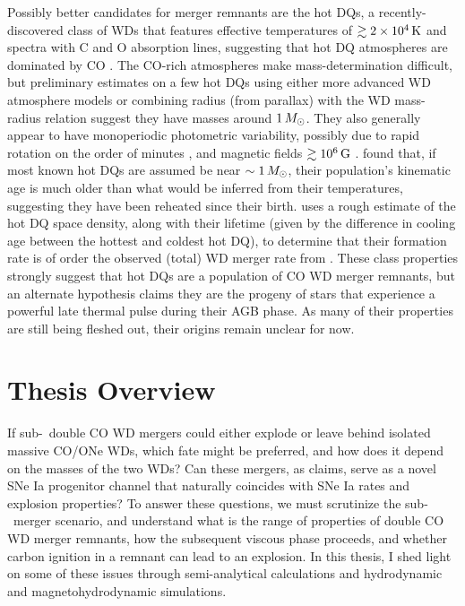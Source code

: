 Possibly better candidates for merger remnants are the hot DQs, a recently-discovered class of WDs that features effective temperatures of $\gtrsim2\times10^4\,\mathrm{K}$ and spectra with C and O absorption lines, suggesting that hot DQ atmospheres are dominated by CO \citep{dufo+07, dufo+08}.  The CO-rich atmospheres make mass-determination difficult, but preliminary estimates on a few hot DQs using either more advanced WD atmosphere models \citep{dufo+11} or combining radius (from parallax) with the WD mass-radius relation \citep{dunl15thesis} suggest they have masses around $1\,\Msun$.  They also generally appear to have monoperiodic photometric variability, possibly due to rapid rotation on the order of minutes \citep{lawr+13, will+16}, and magnetic fields $\gtrsim10^6\,\mathrm{G}$ \citep{dufo+13}.  \cite{dunlc15} found that, if most known hot DQs are assumed be near $\sim1\,\Msun$, their population's kinematic age is much older than what would be inferred from their temperatures, suggesting they have been reheated since their birth.  \cite{dunl15thesis} uses a rough estimate of the hot DQ space density, along with their lifetime (given by the difference in cooling age between the hottest and coldest hot DQ), to determine that their formation rate is of order the observed (total) WD merger rate from \cite{badem12}.  These class properties strongly suggest that hot DQs are a population of CO WD merger remnants, but an alternate hypothesis \citep{dufo+07, alth+09} claims they are the progeny of stars that experience a powerful late thermal pulse during their AGB phase.  As many of their properties are still being fleshed out, their origins remain unclear for now.


\section{Thesis Overview}


If sub-\Mch\ double CO WD mergers could either explode or leave behind isolated massive CO/ONe WDs, which fate might be preferred, and how does it depend on the masses of the two WDs?  Can these mergers, as \citeal{vkercj10} claims, serve as a novel SNe Ia progenitor channel that naturally coincides with SNe Ia rates and explosion properties?  To answer these questions, we must scrutinize the \citeal{vkercj10} sub-\Mch\ merger scenario, and understand what is the range of properties of double CO WD merger remnants, how the subsequent viscous phase proceeds, and whether carbon ignition in a remnant can lead to an explosion.  In this thesis, I shed light on some of these issues through semi-analytical calculations and hydrodynamic and magnetohydrodynamic simulations.

